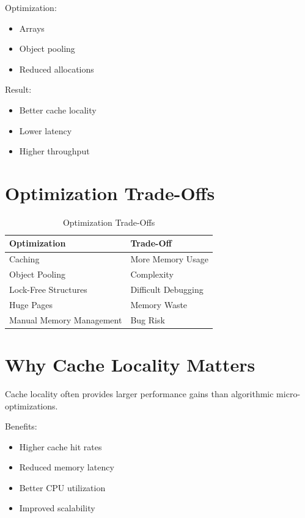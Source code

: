 Optimization:

\begin{itemize}
\item Arrays
\item Object pooling
\item Reduced allocations
\end{itemize}

Result:

\begin{itemize}
\item Better cache locality
\item Lower latency
\item Higher throughput
\end{itemize}

\section{Optimization Trade-Offs}

\begin{table}[h]
\centering
\begin{tabular}{|p{5cm}|p{7cm}|}
\hline
Optimization & Trade-Off \\
\hline
Caching & More Memory Usage \\
\hline
Object Pooling & Complexity \\
\hline
Lock-Free Structures & Difficult Debugging \\
\hline
Huge Pages & Memory Waste \\
\hline
Manual Memory Management & Bug Risk \\
\hline
\end{tabular}
\caption{Optimization Trade-Offs}
\end{table}

\section{Why Cache Locality Matters}

Cache locality often provides larger performance gains than algorithmic micro-optimizations.

Benefits:

\begin{itemize}
\item Higher cache hit rates
\item Reduced memory latency
\item Better CPU utilization
\item Improved scalability
\end{itemize}

